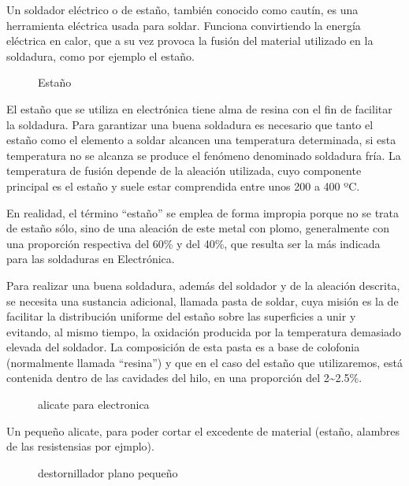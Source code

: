 \documentclass[letterpaper,10pt,english]{sphinxmanual}
\begin{document}
Un soldador eléctrico o de estaño, también conocido como cautín, es
una herramienta eléctrica usada para soldar. Funciona convirtiendo
la energía eléctrica en calor, que a su vez provoca
la fusión del material utilizado en la soldadura, como por
ejemplo el estaño.
\newpage\begin{figure}[htbp]
\centering
\capstart

\noindent{}
\caption{Estaño}\label{np07:id2}\end{figure}

El estaño que se utiliza en electrónica tiene alma de resina con el fin
de facilitar la soldadura. Para garantizar una buena soldadura es
necesario que tanto el estaño como el elemento a soldar alcancen una
temperatura determinada, si esta temperatura no se alcanza se produce
el fenómeno denominado soldadura fría. La temperatura de fusión
depende de la aleación utilizada, cuyo componente principal es
el estaño y suele estar comprendida entre unos 200 a 400 ºC.

En realidad, el término ``estaño'' se emplea de forma impropia
porque no se trata de estaño sólo, sino de una aleación de este metal
con plomo, generalmente con una proporción respectiva
del 60\% y del 40\%, que resulta ser la más indicada para
las soldaduras en Electrónica.

Para realizar una buena soldadura, además del soldador
y de la aleación descrita, se necesita una sustancia adicional,
llamada pasta de soldar, cuya misión es la de facilitar la distribución
uniforme del estaño sobre las superficies a unir y evitando, al mismo
tiempo, la oxidación producida por la temperatura demasiado elevada
del soldador. La composición de esta pasta es a base de colofonia
(normalmente llamada ``resina'') y que en el caso del estaño que
utilizaremos, está contenida dentro de las cavidades del hilo,
en una proporción del 2\textasciitilde{}2.5\%.
\newpage\begin{figure}[htbp]
\centering
\capstart

\noindent{}
\caption{alicate para electronica}\label{np07:id3}\end{figure}

Un pequeño alicate, para poder cortar el excedente de material (estaño,
alambres de las resistensias por ejmplo).
\newpage\begin{figure}[htbp]
\centering
\capstart

\noindent{}
\caption{destornillador plano pequeño}\label{np07:id4}\end{figure}
\end{document}
